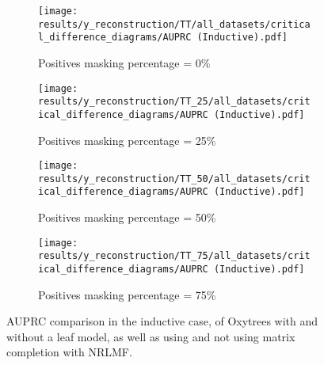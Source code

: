 \documentclass[sn-mathphys-num]{sn-jnl}%
\theoremstyle{thmstyleone}%
\theoremstyle{thmstyletwo}%
\theoremstyle{thmstylethree}%
\begin{document}
\begin{figure}
    \begin{subfigure}{.49\textwidth}
        \centering
        \texttt{[image: results/y\_reconstruction/TT/all\_datasets/critical\_difference\_diagrams/AUPRC (Inductive).pdf]}
        \caption{Positives masking percentage = 0\%}
    \end{subfigure}
    \hfill
    \begin{subfigure}{.49\textwidth}
        \centering
        \texttt{[image: results/y\_reconstruction/TT\_25/all\_datasets/critical\_difference\_diagrams/AUPRC (Inductive).pdf]}
        \caption{Positives masking percentage = 25\%}
    \end{subfigure}
    
    \begin{subfigure}{.49\textwidth}
        \centering
        \texttt{[image: results/y\_reconstruction/TT\_50/all\_datasets/critical\_difference\_diagrams/AUPRC (Inductive).pdf]}
        \caption{Positives masking percentage = 50\%}
    \end{subfigure}
    \hfill
    \begin{subfigure}{.49\textwidth}
        \centering
        \texttt{[image: results/y\_reconstruction/TT\_75/all\_datasets/critical\_difference\_diagrams/AUPRC (Inductive).pdf]}
        \caption{Positives masking percentage = 75\%}
    \end{subfigure}   

    \caption{AUPRC comparison in the inductive case, of Oxytrees with and without a leaf model, as well as using and not using matrix completion with NRLMF.}
    \label{fig:ablation inductive auprc}
\end{figure}
\end{document}
